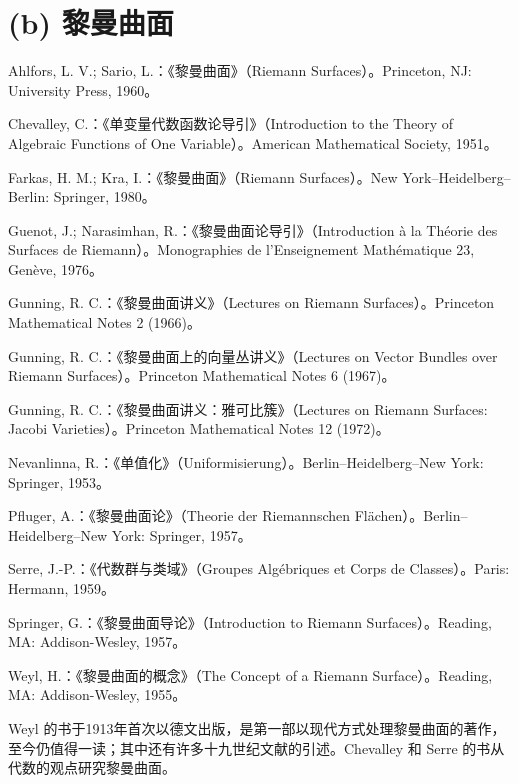 \section*{(b) 黎曼曲面}
\begin{description}[style=nextline,leftmargin=2em]
\item[{[10]}] Ahlfors, L. V.; Sario, L.：《黎曼曲面》（Riemann Surfaces）。Princeton, NJ: University Press, 1960。
\item[{[11]}] Chevalley, C.：《单变量代数函数论导引》（Introduction to the Theory of Algebraic Functions of One Variable）。American Mathematical Society, 1951。
\item[{[12]}] Farkas, H. M.; Kra, I.：《黎曼曲面》（Riemann Surfaces）。New York--Heidelberg--Berlin: Springer, 1980。
\item[{[13]}] Guenot, J.; Narasimhan, R.：《黎曼曲面论导引》（Introduction à la Théorie des Surfaces de Riemann）。Monographies de l'Enseignement Mathématique 23, Genève, 1976。
\item[{[14]}] Gunning, R. C.：《黎曼曲面讲义》（Lectures on Riemann Surfaces）。Princeton Mathematical Notes 2 (1966)。
\item[{[15]}] Gunning, R. C.：《黎曼曲面上的向量丛讲义》（Lectures on Vector Bundles over Riemann Surfaces）。Princeton Mathematical Notes 6 (1967)。
\item[{[16]}] Gunning, R. C.：《黎曼曲面讲义：雅可比簇》（Lectures on Riemann Surfaces: Jacobi Varieties）。Princeton Mathematical Notes 12 (1972)。
\item[{[17]}] Nevanlinna, R.：《单值化》（Uniformisierung）。Berlin--Heidelberg--New York: Springer, 1953。
\item[{[18]}] Pfluger, A.：《黎曼曲面论》（Theorie der Riemannschen Flächen）。Berlin--Heidelberg--New York: Springer, 1957。
\item[{[19]}] Serre, J.-P.：《代数群与类域》（Groupes Algébriques et Corps de Classes）。Paris: Hermann, 1959。
\item[{[20]}] Springer, G.：《黎曼曲面导论》（Introduction to Riemann Surfaces）。Reading, MA: Addison-Wesley, 1957。
\item[{[21]}] Weyl, H.：《黎曼曲面的概念》（The Concept of a Riemann Surface）。Reading, MA: Addison-Wesley, 1955。
\end{description}
Weyl 的书于1913年首次以德文出版，是第一部以现代方式处理黎曼曲面的著作，至今仍值得一读；其中还有许多十九世纪文献的引述。Chevalley 和 Serre 的书从代数的观点研究黎曼曲面。
